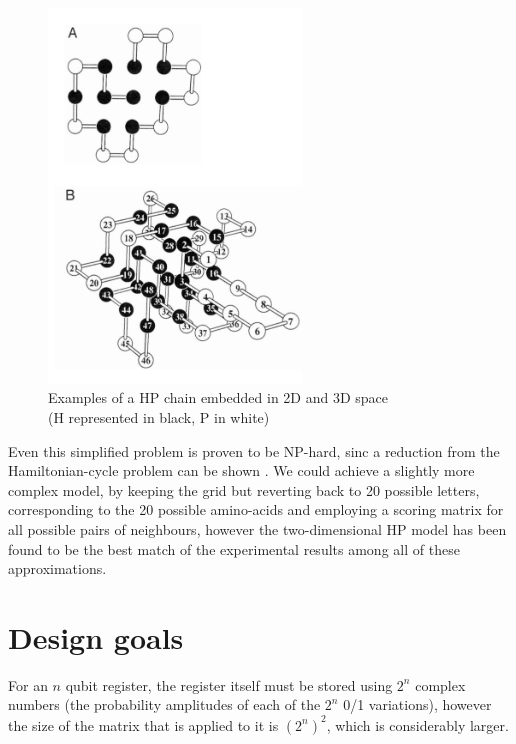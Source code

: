 \begin{figure}[H]
    \centering
    \includegraphics[width=0.6\textwidth]{figures/bioinformatics/hp_model.png}
    \caption{Examples of a HP chain embedded in 2D and 3D space\\(H represented in black, P in white)\cite{dill_principles_2008}}
\end{figure}

Even this simplified problem is proven to be NP-hard, sinc a reduction from the Hamiltonian-cycle problem can be shown \cite{crescenzi_complexity_1998}. We could achieve a slightly more complex model, by keeping the grid but reverting back to 20 possible letters, corresponding to the 20 possible amino-acids and employing a scoring matrix for all possible pairs of neighbours, however the two-dimensional HP model has been found to be the best match of the experimental results among all of these approximations. \cite{crescenzi_complexity_1998}

\section{Design goals}

For an $n$ qubit register, the register itself must be stored using $2^n$ complex numbers (the probability amplitudes of each of the $2^n$ 0/1 variations), however the size of the matrix that is applied to it is $(2^n)^2$, which is considerably larger.

